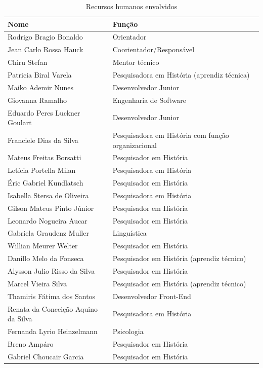 \begin{table}[htbp]
  \small
  \caption{Recursos humanos envolvidos}           %
  \label{tab:rh}
  \centering
  \begin{tabularx}{\linewidth}{@{}>{\RaggedRight\arraybackslash}p{5.5cm}
                                    >{\RaggedRight\arraybackslash}X@{}}
    \toprule
    Nome & Função \\ \midrule
    Rodrigo Bragio Bonaldo & Orientador \\
    Jean Carlo Rossa Hauck & Coorientador/Responsável \\
    Chiru Stefan & Mentor técnico \\
    Patricia Biral Varela & Pesquisadora em História (aprendiz técnica) \\
    Maiko Ademir Nunes & Desenvolvedor Junior \\
    Giovanna Ramalho & Engenharia de Software \\
    Eduardo Peres Luckner Goulart & Desenvolvedor Junior \\
    Franciele Dias da Silva & Pesquisadora em História com função
    organizacional \\
    Mateus Freitas Borsatti & Pesquisador em História \\
    Letícia Portella Milan & Pesquisadora em História \\
    Éric Gabriel Kundlatsch & Pesquisador em História \\
    Isabella Stersa de Oliveira & Pesquisadora em História \\
    Gilson Mateus Pinto Júnior & Pesquisador em História \\
    Leonardo Nogueira Aucar & Pesquisador em História \\
    Gabriela Graudenz Muller & Linguística \\
    Willian Meurer Welter & Pesquisador em História \\
    Danillo Melo da Fonseca & Pesquisador em História (aprendiz técnico) \\
    Alysson Julio Risso da Silva & Pesquisador em História \\
    Marcel Vieira Silva & Pesquisador em História (aprendiz técnico) \\
    Thamiris Fátima dos Santos & Desenvolvedor Front-End \\
    Renata da Conceição Aquino da Silva & Pesquisadora em História \\
    Fernanda Lyrio Heinzelmann & Psicologia \\
    Breno Ampáro & Pesquisador em História \\
    Gabriel Choucair Garcia & Pesquisador em História \\ \bottomrule
  \end{tabularx}
\end{table}


